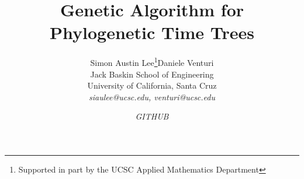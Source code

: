 \title{Genetic Algorithm for Phylogenetic Time Trees}

\author{ 
Simon Austin Lee\thanks{Supported in part by the UCSC Applied Mathematics Department}\hspace{.5cm}Daniele Venturi\hspace{.5cm}\\
Jack Baskin School of Engineering \\
University of California, Santa Cruz\\
\emph{siaulee@ucsc.edu, venturi@ucsc.edu}
}\date{\small\emph{GITHUB}}
\maketitle 
